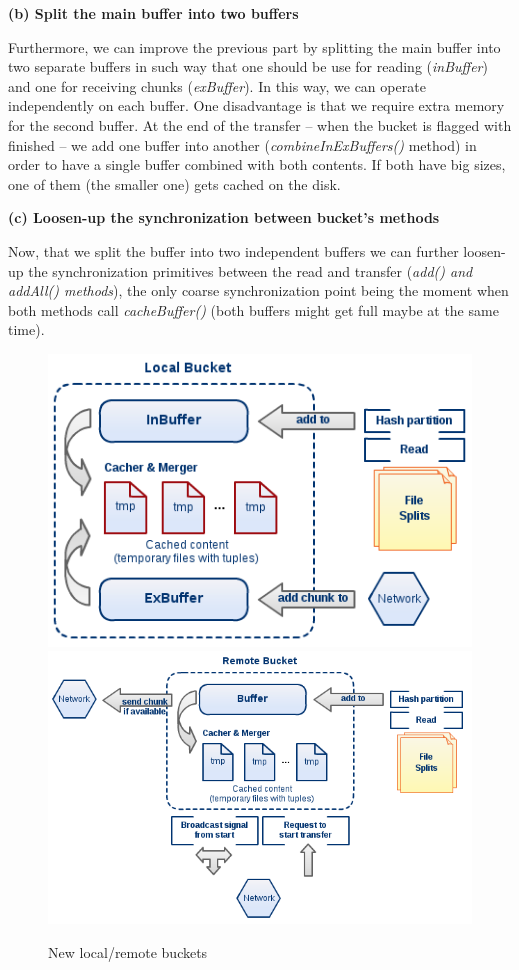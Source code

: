 \textbf{(b) Split the main buffer into two buffers}

Furthermore, we can improve the previous part by splitting the main buffer into two separate buffers in such way that one should be use for reading (\textit{inBuffer}) and one for receiving chunks (\textit{exBuffer}). In this way, we can operate independently on each buffer. One disadvantage is that we require extra memory for the second buffer. At the end of the transfer -- when the bucket is flagged with finished -- we add one buffer into another (\textit{combineInExBuffers()} method) in order to have a single buffer combined with both contents. If both have big sizes, one of them (the smaller one) gets cached on the disk.

\textbf{(c) Loosen-up the synchronization between bucket's methods}

Now, that we split the buffer into two independent buffers we can further loosen-up the synchronization primitives between the read and transfer (\textit{add() and addAll() methods}), the only coarse synchronization point being the moment when both methods call \textit{cacheBuffer()} (both buffers might get full maybe at the same time).

\begin{figure}
\centering
\includegraphics[scale=0.6]{diag4a}
\linebreak
\linebreak
\centering
\includegraphics[scale=0.6]{diag4b}
\caption{New local/remote buckets}
\end{figure}


